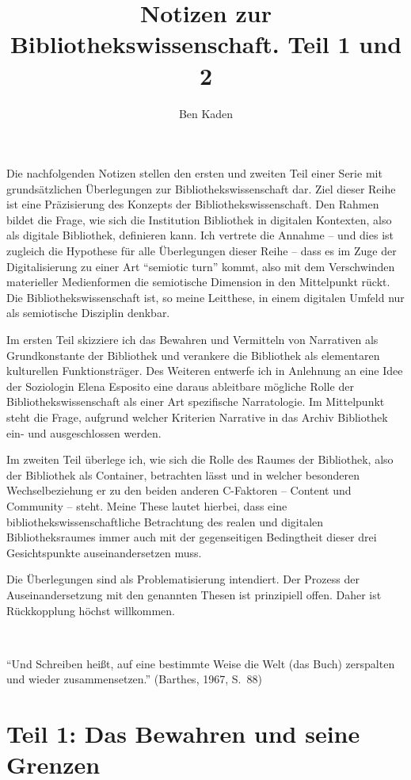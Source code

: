 \documentclass[output=paper]{langscibook}
\title{Notizen zur Bibliothekswissenschaft. Teil 1 und 2}
\author{Ben Kaden}
\begin{document}
\maketitle


\noindent Die nachfolgenden Notizen stellen den ersten und zweiten Teil einer
Serie mit grundsätzlichen Überlegungen zur Bibliothekswissenschaft dar.
Ziel dieser Reihe ist eine Präzisierung des Konzepts der
Bibliothekswissenschaft. Den Rahmen bildet die Frage, wie sich die
Institution Bibliothek in digitalen Kontexten, also als digitale
Bibliothek, definieren kann. Ich vertrete die Annahme -- und dies ist
zugleich die Hypothese für alle Überlegungen dieser Reihe -- dass es im
Zuge der Digitalisierung zu einer Art \enquote{semiotic turn} kommt,
also mit dem Verschwinden materieller Medienformen die semiotische
Dimension in den Mittelpunkt rückt. Die Bibliothekswissenschaft ist, so
meine Leitthese, in einem digitalen Umfeld nur als semiotische Disziplin
denkbar.

Im ersten Teil skizziere ich das Bewahren und Vermitteln von Narrativen
als Grundkonstante der Bibliothek und verankere die Bibliothek als
elementaren kulturellen Funktionsträger. Des Weiteren entwerfe ich in
Anlehnung an eine Idee der Soziologin Elena Esposito eine daraus
ableitbare mögliche Rolle der Bibliothekswissenschaft als einer Art
spezifische Narratologie. Im Mittelpunkt steht die Frage, aufgrund
welcher Kriterien Narrative in das Archiv Bibliothek ein- und
ausgeschlossen werden.

Im zweiten Teil überlege ich, wie sich die Rolle des Raumes der
Bibliothek, also der Bibliothek als Container, betrachten lässt und in
welcher besonderen Wechselbeziehung er zu den beiden anderen C-Faktoren
-- Content und Community -- steht. Meine These lautet hierbei, dass eine
bibliothekswissenschaftliche Betrachtung des realen und digitalen
Bibliotheksraumes immer auch mit der gegenseitigen Bedingtheit dieser
drei Gesichtspunkte auseinandersetzen muss.

Die Überlegungen sind als Problematisierung intendiert. Der Prozess der
Auseinandersetzung mit den genannten Thesen ist prinzipiell offen. Daher
ist Rückkopplung höchst willkommen.

~

\enquote{Und Schreiben heißt, auf eine bestimmte Weise die Welt (das
Buch) zerspalten und wieder zusammensetzen.} (Barthes, 1967, S.~88)

\hypertarget{teil-1-das-bewahren-und-seine-grenzen}{%
\section*{Teil 1: Das Bewahren und seine
Grenzen}\label{teil-1-das-bewahren-und-seine-grenzen}}
\end{document}
